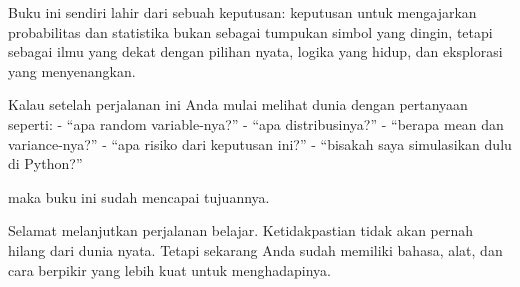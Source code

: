 \documentclass[
  letterpaper,
  DIV=11,
  numbers=noendperiod]{scrreprt}
\begin{document}
Buku ini sendiri lahir dari sebuah keputusan: keputusan untuk
mengajarkan probabilitas dan statistika bukan sebagai tumpukan simbol
yang dingin, tetapi sebagai ilmu yang dekat dengan pilihan nyata, logika
yang hidup, dan eksplorasi yang menyenangkan.

Kalau setelah perjalanan ini Anda mulai melihat dunia dengan pertanyaan
seperti: - ``apa random variable-nya?'' - ``apa distribusinya?'' -
``berapa mean dan variance-nya?'' - ``apa risiko dari keputusan ini?'' -
``bisakah saya simulasikan dulu di Python?''

maka buku ini sudah mencapai tujuannya.

Selamat melanjutkan perjalanan belajar. Ketidakpastian tidak akan pernah
hilang dari dunia nyata. Tetapi sekarang Anda sudah memiliki bahasa,
alat, dan cara berpikir yang lebih kuat untuk menghadapinya.
\end{document}
